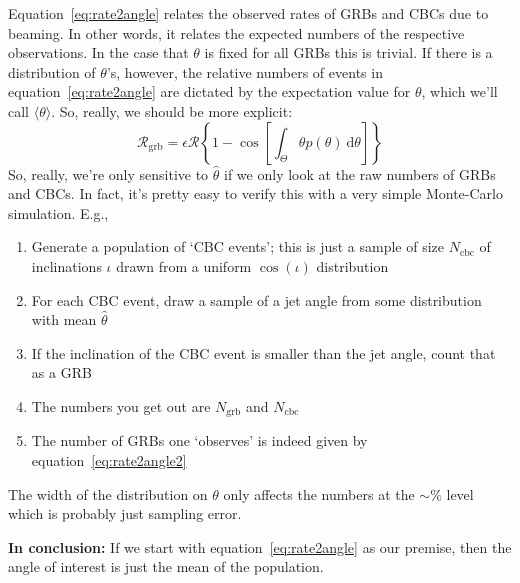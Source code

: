 \documentclass[onecolumn,nofootinbib]{revtex4-1}
\newcommand{\grbrate}{{{\mathcal R}_{\mathrm{grb}}}}
\newcommand{\cbcrate}{{{\mathcal R}}}
\newcommand{\diff}{{\mathrm d}}
\newcommand{\mean}[1]{\langle#1\rangle}
\begin{document}
Equation~\ref{eq:rate2angle} relates the observed rates of GRBs and CBCs due to
beaming.  In other words, it relates the expected numbers of the respective
observations.  In the case that $\theta$ is fixed for all GRBs this is trivial.
If there is a distribution of $\theta$'s, however, the relative numbers of
events in equation~\ref{eq:rate2angle} are dictated by the expectation value for
$\theta$, which we'll call $\langle\theta\rangle$.  So, really, we should be more
explicit:
%
\begin{equation}\label{eq:rate2angle2}
    \grbrate=\epsilon \cbcrate\left\{1-\cos \left [\int_{\Theta} \theta
    p(\theta)~\diff \theta \right ]\right\}
\end{equation}
%
So, really, we're only sensitive to $\hat{\theta}$ if we only look at the raw
numbers of GRBs and CBCs.   In fact, it's pretty easy to verify this with a very
simple Monte-Carlo simulation.  E.g.,
\begin{enumerate}
    \item Generate a population of `CBC events'; this is just a sample of size
        $N_{\text{cbc}}$ of inclinations $\iota$ drawn from a uniform
        $\cos(\iota)$ distribution
    \item For each CBC event, draw a sample of a jet angle from some
        distribution with mean $\hat{\theta}$
    \item If the inclination of the CBC event is smaller than the jet angle,
        count that as a GRB
    \item The numbers you get out are $N_{\text{grb}}$ and $N_{\text{cbc}}$ 
    \item The number of GRBs one `observes' is indeed given by
        equation~\ref{eq:rate2angle2}
\end{enumerate}
%
The width of the distribution on $\theta$ only affects the numbers at the
$\sim\%$ level which is probably just sampling error.

{\bf In conclusion:}  If we start with equation~\ref{eq:rate2angle} as our
premise, then the angle of interest is just the mean of the population.

\begin{comment}
\section{Refinement by all means!}
Actually, \emph{all} of the variables in equation~\ref{eq:rate2angle} are
expectation values:
%
\begin{eqnarray}
    \mean{\grbrate} & = & \mean{\epsilon}\mean{\cbcrate}(1-\cos \mean{\theta}),
    \\
    & = & \int_{\epsilon} \int_{\cbcrate}
\cbcrate.p(\cbcrate)\left\{1-\cos\left[ \int_{\Theta} \theta.p(\theta)~\diff
\theta\right]\right\}
\end{eqnarray}
%
This also nicely encapsulates our treatment of $\epsilon$ which is really
supposed to be the probability that a given CBC results in a GRB and should be
some distribution conditioned on the progenitor physics and parameters.

I'm confused now - is this just working back towards 
\end{comment}
\end{document}
